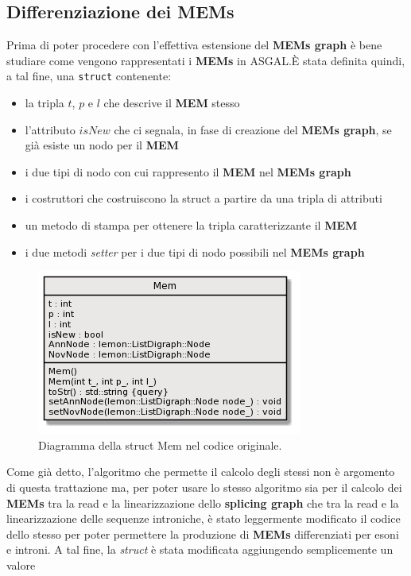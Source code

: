 \documentclass[a4paper,12pt, oneside]{book}
\begin{document}
\subsection{Differenziazione dei MEMs}
Prima di poter procedere con l'effettiva estensione del \textbf{MEMs graph} è
bene studiare come vengono rappresentati i \textbf{MEMs} in ASGAL.\@ È stata
definita quindi, a tal fine, una \texttt{struct} contenente:
\begin{itemize}
  \item la tripla $t$, $p$ e $l$ che descrive il \textbf{MEM} stesso
  \item l'attributo $isNew$ che ci segnala, in fase di creazione del
  \textbf{MEMs graph}, se già esiste un nodo per il \textbf{MEM}
  \item i due tipi di nodo con cui rappresento il \textbf{MEM} nel \textbf{MEMs
    graph} 
  \item i costruttori che costruiscono la struct a partire da una tripla di
  attributi
  \item un metodo di stampa per ottenere la tripla caratterizzante il
  \textbf{MEM}
  \item i due metodi \textit{setter} per i due tipi di nodo possibili nel
  \textbf{MEMs graph}
\end{itemize}
\begin{figure}[H]
  \centering
  \includegraphics[scale = 0.75]{img/mem.png}
  \caption{Diagramma della struct Mem nel codice originale.}
\end{figure}
Come già detto, l'algoritmo che permette il calcolo degli stessi non è argomento
di questa trattazione ma, per poter usare lo stesso algoritmo sia per il calcolo
dei \textbf{MEMs} tra la read e la linearizzazione dello \textbf{splicing graph}
che tra la read e la linearizzazione delle sequenze introniche, è stato
leggermente modificato il codice dello stesso per poter permettere la produzione
di \textbf{MEMs} differenziati per esoni e introni. A tal fine, la
\textit{struct} è stata modificata aggiungendo semplicemente un valore
\end{document}
